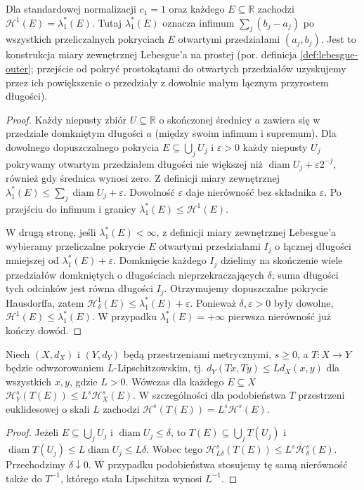 \begin{twierdzenie}
\label{thm:hausdorff-line-26}
Dla standardowej normalizacji $c_1=1$ oraz
każdego $E\subseteq\mathbb R$ zachodzi
$\mathcal H^1(E)=\lambda_1^*(E)$.
Tutaj $\lambda_1^*(E)$ oznacza infimum
$\sum_j(b_j-a_j)$ po wszystkich przeliczalnych
pokryciach $E$ otwartymi przedziałami $(a_j,b_j)$.
Jest to konstrukcja miary zewnętrznej Lebesgue'a
na prostej (por. definicja \ref{def:lebesgue-outer};
przejście od pokryć prostokątami do otwartych przedziałów
uzyskujemy przez ich powiększenie o przedziały z dowolnie
małym łącznym przyrostem długości).
\end{twierdzenie}
\begin{proof}
Każdy niepusty zbiór $U\subseteq\mathbb R$
o skończonej średnicy $a$ zawiera się w przedziale
domkniętym długości $a$ (między swoim infimum
i supremum). Dla dowolnego dopuszczalnego pokrycia
$E\subseteq\bigcup_jU_j$ i $\varepsilon>0$ każdy niepusty $U_j$ pokrywamy otwartym przedziałem długości nie większej niż $\operatorname{diam}U_j+\varepsilon 2^{-j}$, również gdy średnica wynosi zero. Z definicji miary zewnętrznej
$\lambda_1^*(E)\leq\sum_j\operatorname{diam}U_j+\varepsilon$. Dowolność $\varepsilon$ daje nierówność bez składnika $\varepsilon$.
Po przejściu do infimum i granicy
$\lambda_1^*(E)\leq\mathcal H^1(E)$.

W drugą stronę, jeśli $\lambda_1^*(E)<\infty$,
z definicji miary zewnętrznej Lebesgue'a
wybieramy przeliczalne pokrycie $E$ otwartymi
przedziałami $I_j$ o łącznej długości
mniejszej od $\lambda_1^*(E)+\varepsilon$.
Domknięcie każdego $I_j$ dzielimy na skończenie wiele
przedziałów domkniętych o długościach
nieprzekraczających $\delta$; suma długości
tych odcinków jest równa długości $I_j$.
Otrzymujemy dopuszczalne pokrycie Hausdorffa,
zatem $\mathcal H^1_\delta(E)\leq
\lambda_1^*(E)+\varepsilon$.
Ponieważ $\delta,\varepsilon>0$ były dowolne,
$\mathcal H^1(E)\leq\lambda_1^*(E)$.
W przypadku $\lambda_1^*(E)=+\infty$
pierwsza nierówność już kończy dowód.
\end{proof}

\begin{twierdzenie}
\label{thm:hausdorff-lipschitz-26}\label{it:thm:hausdorff-lipschitz-dimension}
Niech $(X,d_X)$ i $(Y,d_Y)$ będą przestrzeniami
metrycznymi, $s\ge0$, a $T:X\to Y$ będzie
odwzorowaniem $L$-Lipschitzowskim, tj.
$d_Y(Tx,Ty)\le Ld_X(x,y)$ dla wszystkich $x,y$,
gdzie $L>0$. Wówczas dla każdego $E\subseteq X$
$\mathcal H_Y^s(T(E))\le L^s\mathcal H_X^s(E)$.
W szczególności dla podobieństwa $T$ przestrzeni
euklidesowej o skali $L$ zachodzi
$\mathcal H^s(T(E))=L^s\mathcal H^s(E)$.
\end{twierdzenie}
\begin{proof}
Jeżeli $E\subseteq\bigcup_jU_j$ i
$\operatorname{diam}U_j\le\delta$, to
$T(E)\subseteq\bigcup_jT(U_j)$ i
$\operatorname{diam}T(U_j)\le L\operatorname{diam}U_j
\le L\delta$. Wobec tego
$\mathcal H^s_{L\delta}(T(E))\le
L^s\mathcal H^s_\delta(E)$.
Przechodzimy $\delta\downarrow0$. W przypadku
podobieństwa stosujemy tę samą nierówność także do
$T^{-1}$, którego stała Lipschitza wynosi $L^{-1}$.
\end{proof}

